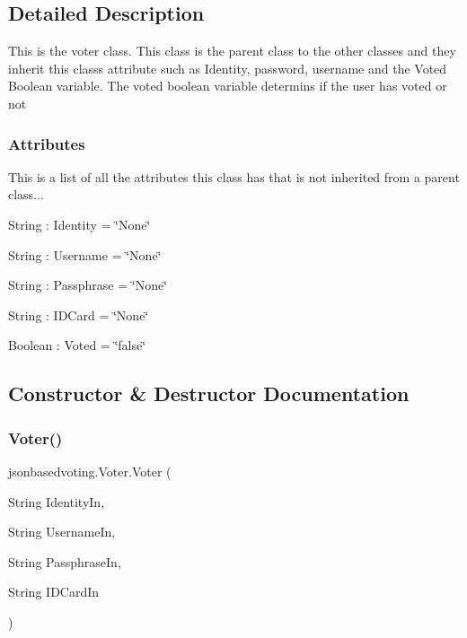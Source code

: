 \subsection{Detailed Description}
This is the voter class. This class is the parent class to the other classes and they inherit this class\textquotesingle{}s attribute such as Identity, password, username and the Voted Boolean variable. The voted boolean variable determins if the user has voted or not ~\newline
 \subsubsection*{Attributes }

This is a list of all the attributes this class has that is not inherited from a parent class... 
\begin{DoxyItemize}
\item String \+: Identity = \char`\"{}\+None\char`\"{} 
\item String \+: Username = \char`\"{}\+None\char`\"{} 
\item String \+: Passphrase = \char`\"{}\+None\char`\"{} 
\item String \+: I\+D\+Card = \char`\"{}\+None\char`\"{} 
\item Boolean \+: Voted = \char`\"{}false\char`\"{} 
\end{DoxyItemize}

\subsection{Constructor \& Destructor Documentation}
\mbox{\label{classjsonbasedvoting_1_1_voter_aca81e3b1df560eed28962dfe89d941b5}} 
\subsubsection{\texorpdfstring{Voter()}{Voter()}}
{\footnotesize\ttfamily jsonbasedvoting.\+Voter.\+Voter (\begin{DoxyParamCaption}\item[{String}]{Identity\+In,  }\item[{String}]{Username\+In,  }\item[{String}]{Passphrase\+In,  }\item[{String}]{I\+D\+Card\+In }\end{DoxyParamCaption})}

